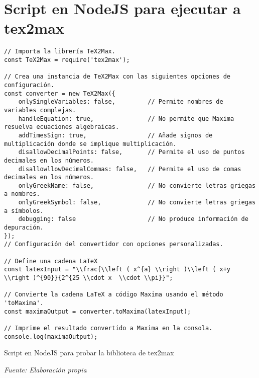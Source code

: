 \section{Script en NodeJS para ejecutar a tex2max}\label{app3:node_js_tex2max}
\begin{longlisting}
	\begin{verbatim}
// Importa la librería TeX2Max.
const TeX2Max = require('tex2max');

// Crea una instancia de TeX2Max con las siguientes opciones de configuración.
const converter = new TeX2Max({
	onlySingleVariables: false,         // Permite nombres de variables complejas.
	handleEquation: true,               // No permite que Maxima resuelva ecuaciones algebraicas.
	addTimesSign: true,                 // Añade signos de multiplicación donde se implique multiplicación.
	disallowDecimalPoints: false,       // Permite el uso de puntos decimales en los números.
	disallowllowDecimalCommas: false,   // Permite el uso de comas decimales en los números.
	onlyGreekName: false,               // No convierte letras griegas a nombres.
	onlyGreekSymbol: false,             // No convierte letras griegas a símbolos.
	debugging: false                    // No produce información de depuración.
});
// Configuración del convertidor con opciones personalizadas.

// Define una cadena LaTeX 
const latexInput = "\\frac{\\left ( x^{a} \\right )\\left ( x+y \\right )^{90}}{2^{25 \\cdot x  \\cdot \\pi}}";

// Convierte la cadena LaTeX a código Maxima usando el método 'toMaxima'.
const maximaOutput = converter.toMaxima(latexInput);

// Imprime el resultado convertido a Maxima en la consola.
console.log(maximaOutput);
	\end{verbatim}
\caption[Script en NodeJS para probar la biblioteca de tex2max]{Script en NodeJS para probar la biblioteca de tex2max} \textit{Fuente: Elaboración propia}
\end{longlisting}

